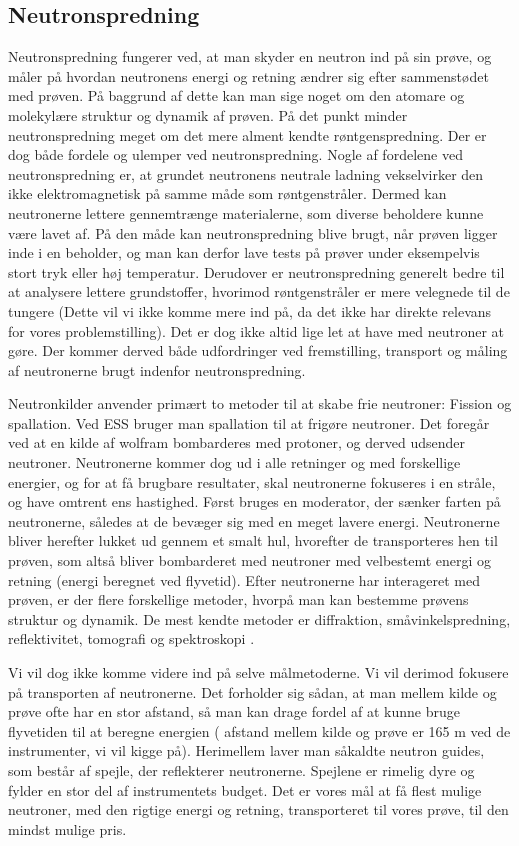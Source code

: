 \documentclass[12pt,oneside,a4paper]{article}
\begin{document}
{{{{{\subsection{Neutronspredning}
Neutronspredning fungerer ved, at man skyder en neutron ind på sin prøve, og måler på hvordan neutronens energi og retning ændrer sig efter sammenstødet med prøven. På baggrund af dette kan man sige noget om den atomare og molekylære struktur og dynamik af prøven. På det punkt minder neutronspredning meget om det mere alment kendte røntgenspredning. Der er dog både fordele og ulemper ved neutronspredning. Nogle af fordelene ved neutronspredning er, at grundet neutronens neutrale ladning vekselvirker den ikke elektromagnetisk på samme måde som røntgenstråler. Dermed kan neutronerne lettere gennemtrænge materialerne, som diverse beholdere kunne være lavet af. På den måde kan neutronspredning blive brugt, når prøven ligger inde i en beholder, og man kan derfor lave tests på prøver under eksempelvis stort tryk eller høj temperatur. Derudover er neutronspredning generelt bedre til at analysere lettere grundstoffer, hvorimod røntgenstråler er mere velegnede til de tungere (Dette vil vi ikke komme mere ind på, da det ikke har direkte relevans for vores problemstilling). Det er dog ikke altid lige let at have med neutroner at gøre. Der kommer derved både udfordringer ved fremstilling, transport og måling af neutronerne brugt indenfor neutronspredning.


Neutronkilder anvender primært to metoder til at skabe frie neutroner: Fission og spallation. Ved ESS bruger man spallation til at frigøre neutroner. Det foregår ved at en kilde af wolfram bombarderes med protoner, og derved udsender neutroner. Neutronerne kommer dog ud i alle retninger og med forskellige energier, og for at få brugbare resultater, skal neutronerne fokuseres i en stråle, og have omtrent ens hastighed. Først bruges en moderator, der sænker farten på neutronerne, således at de bevæger sig med en meget lavere energi. Neutronerne bliver herefter lukket ud gennem et smalt hul, hvorefter de transporteres hen til prøven, som altså bliver bombarderet med neutroner med velbestemt energi og retning (energi beregnet ved flyvetid). Efter neutronerne har interageret med prøven, er der flere forskellige metoder, hvorpå man kan bestemme prøvens struktur og dynamik. De mest kendte metoder er diffraktion, småvinkelspredning, reflektivitet, tomografi og spektroskopi \cite{ess_folder}.

Vi vil dog ikke komme videre ind på selve målmetoderne. Vi vil derimod fokusere på transporten af neutronerne. Det forholder sig sådan, at man mellem kilde og prøve ofte har en stor afstand, så man kan drage fordel af at kunne bruge flyvetiden til at beregne energien ( afstand mellem kilde og prøve er 165 m ved de instrumenter, vi vil kigge på). Herimellem laver man såkaldte neutron guides, som består af spejle, der reflekterer neutronerne. Spejlene er rimelig dyre og fylder en stor del af instrumentets budget. Det er vores mål at få flest mulige neutroner, med den rigtige energi og retning, transporteret til vores prøve, til den mindst mulige pris.


}}}}}
\end{document}
